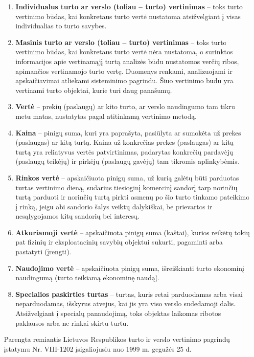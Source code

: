 \begin{enumerate}
    \item \textbf{Individualus turto ar verslo (toliau – turto) vertinimas} – toks turto vertinimo būdas, kai konkretaus turto vertė nustatoma atsižvelgiant į visas individualias to turto savybes.

    \item \textbf{Masinis turto ar verslo (toliau – turto) vertinimas} – toks turto vertinimo būdas, kai konkretaus turto vertė nėra nustatoma, o surinktos informacijos apie vertinamąjį turtą analizės būdu nustatomos verčių ribos, apimančios vertinamojo turto vertę. Duomenys renkami, analizuojami ir apskaičiavimai atliekami sisteminimo pagrindu. Šiuo vertinimo būdu yra vertinami turto objektai, kurie turi daug panašumų.

    \item \textbf{Vertė} – prekių (paslaugų) ar kito turto, ar verslo naudingumo tam tikru metu matas, nustatytas pagal atitinkamą vertinimo metodą.

    \item \textbf{Kaina} – pinigų suma, kuri yra paprašyta, pasiūlyta ar sumokėta už prekes (paslaugas) ar kitą turtą. Kaina už konkrečias prekes (paslaugas) ar kitą turtą yra reliatyvus vertės patvirtinimas, padarytas konkrečių pardavėjų (paslaugų teikėjų) ir pirkėjų (paslaugų gavėjų) tam tikromis aplinkybėmis.

    \item \textbf{Rinkos vertė} – apskaičiuota pinigų suma, už kurią galėtų būti parduotas turtas vertinimo dieną, sudarius tiesioginį komercinį sandorį tarp norinčių turtą parduoti ir norinčių turtą pirkti asmenų po šio turto tinkamo pateikimo į rinką, jeigu abi sandorio šalys veiktų dalykiškai, be prievartos ir nesąlygojamos kitų sandorių bei interesų.

    \item \textbf{Atkuriamoji vertė} – apskaičiuota pinigų suma (kaštai), kurios reikėtų tokių pat fizinių ir eksploatacinių savybių objektui sukurti, pagaminti arba pastatyti (įrengti).

    \item \textbf{Naudojimo vertė} – apskaičiuota pinigų suma, išreiškianti turto ekonominį naudingumą (turto teikiamą ekonominę naudą).

    \item \textbf{Specialios paskirties turtas} – turtas, kuris retai parduodamas arba visai neparduodamas, išskyrus atvejus, kai jis yra viso verslo sudedamoji dalis. Atsižvelgiant į specialų panaudojimą, toks objektas laikomas ribotos paklausos arba ne rinkai skirtu turtu.
\end{enumerate}

Parengta remiantis Lietuvos Respublikos turto ir verslo vertinimo pagrindų įstatymu Nr. VIII-1202 įsigaliojusiu nuo 1999 m. gegužės 25 d.

\pagebreak